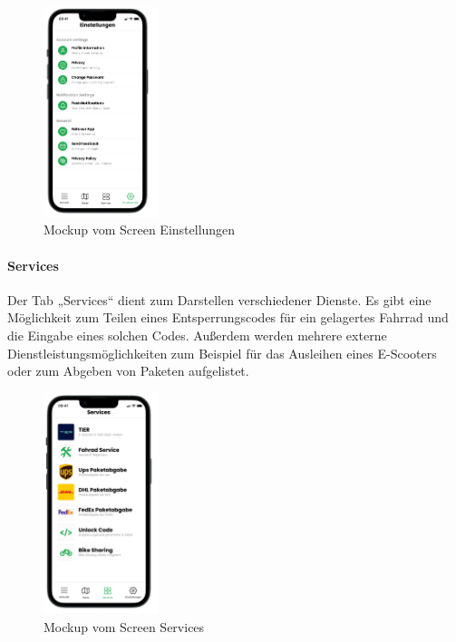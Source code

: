 \begin{figure}[H]
  \centering
  \includegraphics[width=0.3\textwidth]{images/app_mock_settings}
  \caption{\Gls{Mockup} vom Screen Einstellungen}
  \label{fig:screensettingsmock}
\end{figure}

\bigskip


\paragraph{Services}Der \Gls{Tab} „Services“ dient zum Darstellen verschiedener Dienste. Es gibt eine Möglichkeit zum Teilen eines Entsperrungscodes für ein gelagertes Fahrrad und die Eingabe eines solchen Codes. Außerdem werden mehrere externe Dienstleistungsmöglichkeiten zum Beispiel für das Ausleihen eines E-Scooters oder zum Abgeben von Paketen aufgelistet.

\begin{figure}[H]
  \centering
  \includegraphics[width=0.3\textwidth]{images/app_mock_services}
  \caption{\Gls{Mockup} vom Screen Services}
  \label{fig:screenservicesmock}
\end{figure}

